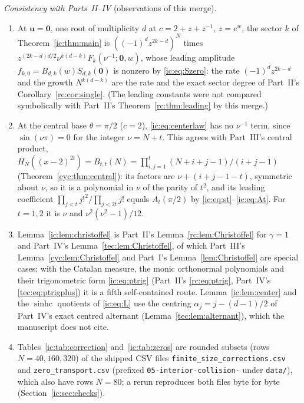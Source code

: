 \documentclass[11pt,a4paper]{article}
\numberwithin{equation}{section}
\theoremstyle{definition}
\theoremstyle{remark}
\newcommand{\bu}{\boldsymbol u}
\newcommand{\sinhc}{\operatorname{sinhc}}
\begin{document}
\emph{Consistency with Parts~II--IV} (observations of this merge).
\begin{enumerate}[leftmargin=*,itemsep=2pt]
\item At $\bu=\boldsymbol0$, one root of multiplicity $d$ at $c=2+z+z^{-1}$,
 $z=e^w$, the sector $k$ of Theorem~\ref{ic:thm:main} is
 $((-1)^dz^{2k-d})^N$ times $z^{(2k-d)d/2}\nu^{k(d-k)}F_k(\nu^{-1};\boldsymbol0,w)$,
 whose leading amplitude $f_{k,0}=B_{d,k}(w)S_{d,k}(\boldsymbol0)$ is nonzero
 by \eqref{ic:eq:Szero}: the rate $(-1)^dz^{2k-d}$ and the growth
 $N^{k(d-k)}$ are the rate and the exact sector degree of Part~II's
 Corollary~\ref{rc:cor:single}.  (The leading constants were not compared
 symbolically with Part~II's Theorem~\ref{rc:thm:leading} by this merge.)
\item At the central base $\theta=\pi/2$ ($c=2$), \eqref{ic:eq:centerlaw}
 has no $\nu^{-1}$ term, since $\sin(\nu\pi)=0$ for the integer $\nu=N+t$.
 This agrees with Part~III's central product,
 $H_N((x-2)^{2t})=B_{t,t}(N)=\prod_{i,j=1}^t(N+i+j-1)/(i+j-1)$
 (Theorem~\ref{cyc:thm:central}): its factors are $\nu+(i+j-1-t)$, symmetric
 about $\nu$, so it is a polynomial in $\nu$ of the parity of $t^2$, and its
 leading coefficient $\prod_{j<t}j!^2/\prod_{j<2t}j!$ equals $A_t(\pi/2)$
 by \eqref{ic:eq:st}--\eqref{ic:eq:At}.  For $t=1,2$ it is $\nu$ and
 $\nu^2(\nu^2-1)/12$.
\item Lemma~\ref{ic:lem:christoffel} is Part~II's
 Lemma~\ref{rc:lem:Christoffel} for $\gamma=1$ and Part~IV's
 Lemma~\ref{tec:lem:Christoffel}, of which Part~III's
 Lemma~\ref{cyc:lem:Christoffel} and Part~I's Lemma~\ref{lem:Christoffel}
 are special cases; with the Catalan measure, the monic orthonormal
 polynomials and their trigonometric form \eqref{ic:eq:ptrig} (Part~II's
 \eqref{rc:eq:ptrig}, Part~IV's \eqref{tec:eq:ptrigplus}) it is a fifth
 self-contained route.  Lemma~\ref{ic:lem:center} and the $\sinhc$ quotients
 of \eqref{ic:eq:L} use the centring $\alpha_j=j-(d-1)/2$ of Part~IV's exact
 centred alternant (Lemma~\ref{tec:lem:alternant}), which the manuscript does
 not cite.
\item Tables~\ref{ic:tab:correction} and~\ref{ic:tab:zeros} are rounded
 subsets (rows $N=40,160,320$) of the shipped CSV files
 \nolinkurl{finite_size_corrections.csv} and \nolinkurl{zero_transport.csv}
 (prefixed \texttt{05-interior-collision-} under \nolinkurl{data/}), which
 also have rows $N=80$; a rerun reproduces both files byte for byte
 (Section~\ref{ic:sec:checks}).
\end{enumerate}
\end{document}

